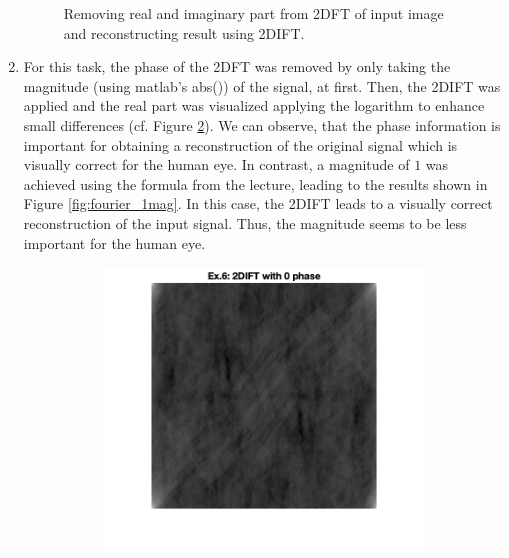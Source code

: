 \documentclass{article}
\begin{document}
\begin{enumerate}
\begin{figure}
\begin{subfigure}[c]{0.3\textwidth}
    \end{subfigure}
    \caption{Removing real and imaginary part from 2DFT of input image and reconstructing result using 2DIFT.}
    \label{fig:fourier}
    \end{figure}
    \item For this task, the phase of the 2DFT was removed by only taking the magnitude (using matlab's abs()) of the signal, at first. Then, the 2DIFT was applied and the real part was visualized applying the logarithm to enhance small differences (cf. Figure \ref{fig:fourier_0phase}). We can observe, that the phase information is important for obtaining a reconstruction of the original signal which is visually correct for the human eye. In contrast, a magnitude of $1$ was achieved using the formula from the lecture, leading to the results shown in Figure \ref{fig:fourier_1mag}. In this case, the 2DIFT leads to a visually correct reconstruction of the input signal. Thus, the magnitude seems to be less important for the human eye.
    \begin{figure}
    \centering
    \begin{subfigure}[b]{0.4\textwidth}
        \includegraphics[width=\textwidth]{images/lena_0phase.png}
        \label{fig:fourier_0phase}
    \end{subfigure}
    \begin{subfigure}[b]{0.4\textwidth}

\end{subfigure}
\end{figure}
\end{enumerate}
\end{document}
